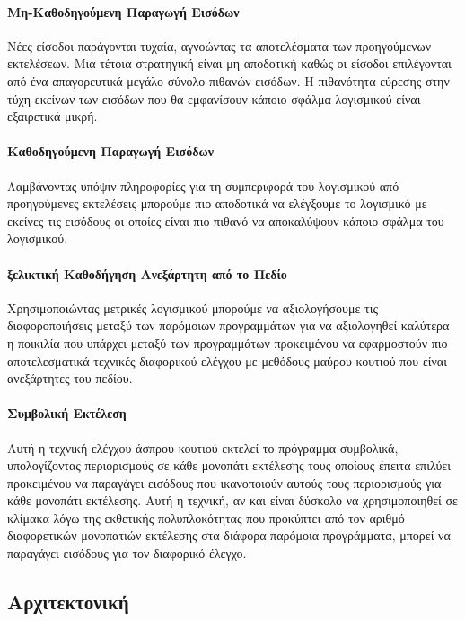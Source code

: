 \documentclass[12pt]{article}
\begin{document}
\paragraph{Μη-Καθοδηγούμενη Παραγωγή Εισόδων}
Νέες είσοδοι παράγονται τυχαία, αγνοώντας τα αποτελέσματα των προηγούμενων εκτελέσεων. Μια τέτοια στρατηγική είναι μη αποδοτική καθώς οι είσοδοι επιλέγονται από ένα απαγορευτικά μεγάλο σύνολο πιθανών εισόδων. Η πιθανότητα εύρεσης στην τύχη εκείνων των εισόδων που θα εμφανίσουν κάποιο σφάλμα λογισμικού είναι εξαιρετικά μικρή.

\paragraph{Καθοδηγούμενη Παραγωγή Εισόδων}
Λαμβάνοντας υπόψιν πληροφορίες για τη συμπεριφορά του λογισμικού από προηγούμενες εκτελέσεις μπορούμε πιο αποδοτικά να ελέγξουμε το λογισμικό με εκείνες τις εισόδους οι οποίες είναι πιο πιθανό να αποκαλύψουν κάποιο σφάλμα του λογισμικού.

\paragraph{ξελικτική Καθοδήγηση Ανεξάρτητη από το Πεδίο}
Χρησιμοποιώντας μετρικές λογισμικού μπορούμε να αξιολογήσουμε τις διαφοροποιήσεις μεταξύ των παρόμοιων προγραμμάτων για να αξιολογηθεί καλύτερα η ποικιλία που υπάρχει μεταξύ των προγραμμάτων προκειμένου να εφαρμοστούν πιο αποτελεσματικά τεχνικές διαφορικού ελέγχου με μεθόδους μαύρου κουτιού που είναι ανεξάρτητες του πεδίου.

\paragraph{Συμβολική Εκτέλεση}
Αυτή η τεχνική ελέγχου άσπρου-κουτιού εκτελεί το πρόγραμμα συμβολικά, υπολογίζοντας περιορισμούς σε κάθε μονοπάτι εκτέλεσης τους οποίους έπειτα επιλύει προκειμένου να παραγάγει εισόδους που ικανοποιούν αυτούς τους περιορισμούς για κάθε μονοπάτι εκτέλεσης. Αυτή η τεχνική, αν και είναι δύσκολο να χρησιμοποιηθεί σε κλίμακα λόγω της εκθετικής πολυπλοκότητας που προκύπτει από τον αριθμό διαφορετικών μονοπατιών εκτέλεσης στα διάφορα παρόμοια προγράμματα, μπορεί να παραγάγει εισόδους για τον διαφορικό έλεγχο.

\subsection{Αρχιτεκτονική}
\end{document}
